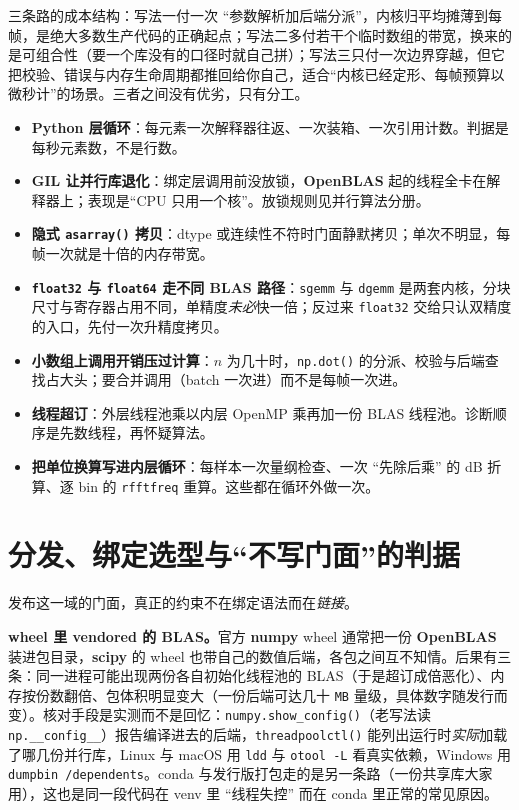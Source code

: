 \documentclass[12pt,a4paper,fontset=fandol]{ctexbook}
\newcommand{\Fn}[1]{\texttt{#1()}}
\newcommand{\Tp}[1]{\texttt{#1}}
\newcommand{\Lib}[1]{\textbf{#1}}
\newcommand{\Lang}[1]{\textsf{\bfseries #1}}
\newcommand{\PY}{\Lang{Python}}
\begin{document}
三条路的成本结构：写法一付一次 ``参数解析加后端分派''，内核归平均摊薄到每帧，是绝大多数生产代码的正确起点；写法二多付若干个临时数组的带宽，换来的是可组合性（要一个库没有的口径时就自己拼）；写法三只付一次边界穿越，但它把校验、错误与内存生命周期都推回给你自己，适合``内核已经定形、每帧预算以微秒计''的场景。三者之间没有优劣，只有分工。

\begin{warning}[title={七个常见性能陷阱，按出现频率排序}]
\begin{itemize}
\item \textbf{\PY{} 层循环}：每元素一次解释器往返、一次装箱、一次引用计数。判据是每秒元素数，不是行数。
\item \textbf{GIL 让并行库退化}：绑定层调用前没放锁，\Lib{OpenBLAS} 起的线程全卡在解释器上；表现是``CPU 只用一个核''。放锁规则见并行算法分册。
\item \textbf{隐式 \Fn{asarray} 拷贝}：dtype 或连续性不符时门面静默拷贝；单次不明显，每帧一次就是十倍的内存带宽。
\item \textbf{\Tp{float32} 与 \Tp{float64} 走不同 BLAS 路径}：\Tp{sgemm} 与 \Tp{dgemm} 是两套内核，分块尺寸与寄存器占用不同，单精度\emph{未必}快一倍；反过来 \Tp{float32} 交给只认双精度的入口，先付一次升精度拷贝。
\item \textbf{小数组上调用开销压过计算}：$n$ 为几十时，\Fn{np.dot} 的分派、校验与后端查找占大头；要合并调用（batch 一次进）而不是每帧一次进。
\item \textbf{线程超订}：外层线程池乘以内层 OpenMP 乘再加一份 BLAS 线程池。诊断顺序是先数线程，再怀疑算法。
\item \textbf{把单位换算写进内层循环}：每样本一次量纲检查、一次 ``先除后乘'' 的 dB 折算、逐 bin 的 \Tp{rfftfreq} 重算。这些都在循环外做一次。
\end{itemize}
\end{warning}

\section{分发、绑定选型与``不写门面''的判据}

发布这一域的门面，真正的约束不在绑定语法而在\emph{链接}。

\textbf{wheel 里 vendored 的 BLAS。}官方 \Lib{numpy} wheel 通常把一份 \Lib{OpenBLAS} 装进包目录，\Lib{scipy} 的 wheel 也带自己的数值后端，各包之间互不知情。后果有三条：同一进程可能出现两份各自初始化线程池的 BLAS（于是超订成倍恶化）、内存按份数翻倍、包体积明显变大（一份后端可达几十 \Tp{MB} 量级，具体数字随发行而变）。核对手段是实测而不是回忆：\Fn{numpy.show\_config}（老写法读 \Tp{np.\_\_config\_\_}）报告编译进去的后端，\Fn{threadpoolctl} 能列出运行时\emph{实际}加载了哪几份并行库，Linux 与 macOS 用 \Tp{ldd} 与 \Tp{otool -L} 看真实依赖，Windows 用 \Tp{dumpbin /dependents}。conda 与发行版打包走的是另一条路（一份共享库大家用），这也是同一段代码在 venv 里 ``线程失控'' 而在 conda 里正常的常见原因。
\end{document}
